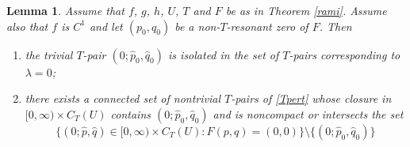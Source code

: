\documentclass[a4paper]{amsart}
\numberwithin{equation}{section}
\newtheorem{lemma}[theorem]{Lemma}
\begin{document}
\begin{lemma} \label{rametto}
Assume that $f$, $g$, $h$, $U$, $T$ and $F$ be as in Theorem \ref{rami}. Assume also that
$f$ is $C^1$ and let $(p_0,q_0)$ be a non-$T$-resonant zero of $F$. Then
\begin{enumerate}
\item the trivial $T$-pair $(0;\hat p_0,\hat q_0)$ is isolated in the set of 
$T$\hbox{-}pairs corresponding to $\lambda =0$;
\item there exists a connected set of nontrivial $T$\hbox{-}pairs of \eqref{Tpert} whose 
closure in $[0,\infty)\times C_T(U)$ contains $(0;\hat p_0,\hat q_0)$ and is noncompact or 
intersects the set 
\[
\big\{(0;\hat p,\hat q)\in [0,\infty)\times C_T(U):F(p,q)=(0,0)\big\}\setminus
  \{(0;\hat p_0,\hat q_0)\}
\]
\end{enumerate}
\end{lemma}
\end{document}
